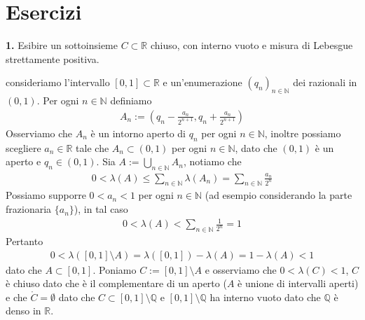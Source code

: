 \documentclass[oneside, 11pt]{amsbook}
\makeatletter
\newcommand{\R}{\mathbb{R}}
\newcommand{\gr}[1]{\textbf{#1}}%
\newcommand{\N}{{\mathbb N}}
\newcommand{\Q}{{\mathbb Q}}
\newcommand{\0}{{(0)}}
\newcommand{\3}{{(3)}}
\theoremstyle{colonplain}
\theoremstyle{colondefinition}
\theoremstyle{colonremark}
\numberwithin{equation}{chapter}
\renewcommand{\proofname}{Dimostrazione}
\renewenvironment{proof}[1][\proofname]{\par
  \pushQED{\qed}%
  \normalfont \topsep6\p@\@plus6\p@\relax
  \trivlist
  \item[\hskip\labelsep\bfseries #1:]\ignorespaces
}{%
  \popQED\endtrivlist\@endpefalse
}
\makeatother
\begin{document}
\section{Esercizi}
\gr{1.} Esibire un sottoinsieme $C \subset \R$ chiuso, con interno vuoto e misura di Lebesgue strettamente positiva.
\begin{proof}[Soluzione]
    consideriamo l'intervallo $[0, 1] \subset \R$ e un'enumerazione $(q_n)_{n \in \N}$ dei razionali in $(0, 1)$. Per ogni $n \in \N$ definiamo
    \begin{align}
        A_n := \left(q_n - \frac{a_n}{2^{n + 1}}, q_n + \frac{a_n}{2^{n + 1}}\right)
    \end{align}
    Osserviamo che $A_n$ è un intorno aperto di $q_n$ per ogni $n \in \N$, inoltre possiamo scegliere $a_n \in \R$ tale che $A_n \subset (0, 1)$ per ogni $n \in \N$, dato che $(0, 1)$ è un aperto e $q_n \in (0, 1)$. Sia $A := \bigcup_{n \in \N} A_n$, notiamo che
    \begin{align}
        0 < \lambda(A) \leq \sum_{n \in \N} \lambda(A_n) = \sum_{n \in \N} \frac{a_n}{2^n}
    \end{align}
    Possiamo supporre $0 < a_n < 1$ per ogni $n \in \N$ (ad esempio considerando la parte frazionaria $\{a_n\}$), in tal caso
    \begin{align}
        0 < \lambda(A) < \sum_{n \in \N}\frac{1}{2^n} = 1
    \end{align}
    Pertanto
    \begin{align}
        0 < \lambda([0, 1] \setminus A) = \lambda([0, 1]) - \lambda(A) = 1 - \lambda(A) < 1
    \end{align}
    dato che $A \subset [0, 1]$. Poniamo $C := [0, 1] \setminus A$ e osserviamo che $0 < \lambda(C) < 1$, $C$ è chiuso dato che è il complementare di un aperto ($A$ è unione di intervalli aperti) e che $\mathring{C} = \emptyset$ dato che $C \subset [0, 1] \setminus \Q$ e $[0, 1] \setminus \Q$ ha interno vuoto dato che $\Q$ è denso in $\R$. 
\end{proof}
\end{document}
